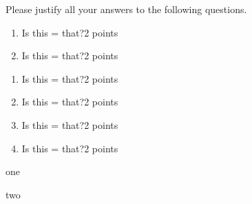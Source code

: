 \documentclass{exam}
\begin{document}
\newpage


	Please justify all your answers to the following questions.
	\begin{enumerate}
		\item Is this = that?\hfill 2 points
		\begin{tcolorbox}
		\end{tcolorbox}
		\item Is this = that?\hfill 2 points
		\begin{tcolorbox}
		\end{tcolorbox}
	\end{enumerate}
	
	
	\begin{enumerate}
		\item Is this = that?\hfill 2 points
		\begin{tcolorbox}
		\end{tcolorbox}
		\item Is this = that?\hfill 2 points
		\begin{tcolorbox}
		\end{tcolorbox}
		\item Is this = that?\hfill 2 points
		\begin{tcolorbox}
		\end{tcolorbox}
		\item Is this = that?\hfill 2 points
		\begin{tcolorbox}
				\fillwithlines{\tcbtextheight}
		\end{tcolorbox}
	\end{enumerate}

	
	\newpage

\begin{minipage}[s]{\linewidth}
	one
	\vfill
	\end{minipage}
\begin{minipage}[s]{\linewidth}
	two
		\vfill
\end{minipage}


\newpage
	
\end{document}
